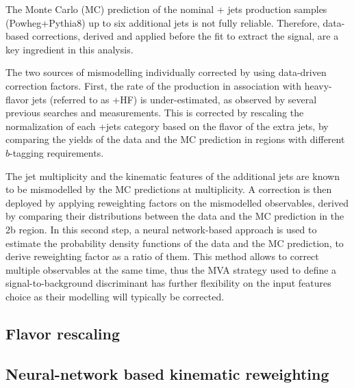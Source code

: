 The Monte Carlo (MC) prediction of the nominal \ttbar + jets production samples (Powheg+Pythia8) up to six additional jets is not fully reliable. Therefore, data-based corrections, derived and applied before the fit to extract the signal, are a key ingredient in this analysis.

The two sources of mismodelling individually corrected by using data-driven correction factors. First, the rate of the \ttbar production in association with heavy-flavor jets (referred to as \ttbar +HF) is under-estimated, as observed by several previous searches and measurements. This is corrected by rescaling the normalization of each \ttbar +jets category based on the flavor of the extra jets, by comparing the yields of the data and the MC prediction in regions with different $b$-tagging requirements.

The jet multiplicity and the kinematic features of the additional jets are known to be mismodelled by the MC predictions at  multiplicity. A correction is then deployed by applying reweighting factors on the mismodelled observables, derived by comparing their distributions between the data and the MC prediction in the 2b region.
In this second step, a neural network-based approach is used to estimate the probability density functions of the data and the MC prediction, to derive reweighting factor as a ratio of them. This method allows to correct multiple observables at the same time, thus the MVA strategy used to define a signal-to-background discriminant has further flexibility on the input features choice as their modelling will typically be corrected.


\subsection{Flavor rescaling}
\label{sec:hf_rew}



\clearpage
\subsection{Neural-network based kinematic reweighting}
\label{sec:nn_rew}

